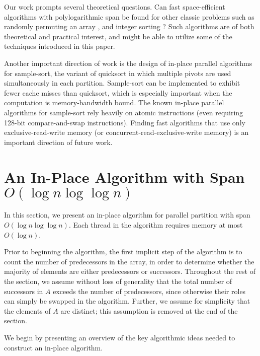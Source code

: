 \documentclass[twoside,leqno,twocolumn]{article}
\renewcommand{\paragraph}[1]{\vspace{0.09in}\noindent{\bf \boldmath #1.}}
\begin{document}
Our work prompts several theoretical questions. Can fast
space-efficient algorithms with polylogarithmic span be found for
other classic problems such as randomly permuting an array
\cite{Anderson90, AlonsoSc96, ShunGu15}, and integer sorting
\cite{Rajasekaran92, HanHe12, AlbersHa97, Han01, GerbessiotisSi04}?
Such algorithms are of both theoretical and practical interest, and
might be able to utilize some of the techniques introduced in this
paper.

Another important direction of work is the design of in-place parallel
algorithms for sample-sort, the variant of quicksort in which multiple
pivots are used simultaneously in each partition. Sample-sort can be
implemented to exhibit fewer cache misses than quicksort, which is
especially important when the computation is memory-bandwidth
bound. The known in-place parallel algorithms for sample-sort rely
heavily on atomic instructions \cite{AxtmannWi17} (even requiring
128-bit compare-and-swap instructions). Finding fast algorithms that
use only exclusive-read-write memory (or
concurrent-read-exclusive-write memory) is an important direction of
future work.



\section{An In-Place Algorithm with Span $O(\log n \log \log n)$}\label{secalg}

In this section, we present an in-place algorithm for parallel
partition with span $O(\log n \log \log n)$. Each thread in the
algorithm requires memory at most $O(\log n)$.

Prior to beginning the algorithm, the first implicit step of the
algorithm is to count the number of predecessors in the array, in
order to determine whether the majority of elements are either
predecessors or successors. Throughout the rest of the section, we
assume without loss of generality that the total number of successors
in $A$ exceeds the number of predecessors, since otherwise their roles
can simply be swapped in the algorithm. Further, we assume for
simplicity that the elements of $A$ are distinct; this assumption is
removed at the end of the section.


\paragraph{Algorithm Outline}
We begin by presenting an overview of the key algorithmic ideas needed
to construct an in-place algorithm.
\end{document}
